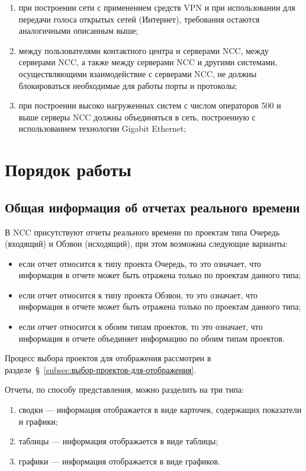 \begin{enumerate}
    \item при построении сети с применением средств VPN и при использовании для передачи голоса открытых сетей (Интернет), требования остаются аналогичными описанным выше;
    \item между пользователями контактного центра и серверами NCC, между серверами NCC, а также между серверами NCC и другими системами, осуществляющими взаимодействие с серверами NCC, не должны блокироваться необходимые для работы порты и протоколы;
    \item при построении высоко нагруженных систем с числом операторов 500 и выше серверы NCC должны объединяться в сеть, построенную с использованием технологии Gigabit Ethernet;
\end{enumerate}

\section{Порядок работы}

\subsection{Общая информация об отчетах реального времени}

В NCC присутствуют отчеты реального времени по проектам типа Очередь (входящий) и Обзвон (исходящий), при этом возможны следующие варианты:
\begin{itemize}
    \item если отчет относится к типу проекта Очередь, то это означает, что информация в отчете может быть отражена
    только по проектам данного типа;
    \item если отчет относится к типу проекта Обзвон,
    то это означает, что информация в отчете может быть отражена только по проектам данного типа;
    \item если отчет относится к обоим типам проектов, то это означает, что информация в отчете объединяет информацию по обоим типам проектов.
\end{itemize}

Процесс выбора проектов для отображения рассмотрен в разделе~\S~\ref{subsec:выбор-проектов-для-отображения}.

Отчеты, по способу представления, можно разделить на три типа:
\begin{enumerate}[1)]
    \item сводки --- информация отображается в виде карточек, содержащих показатели и графики;
    \item таблицы --- информация отображается в виде таблицы;
    \item графики --- информация отображается в виде графиков.
\end{enumerate}

